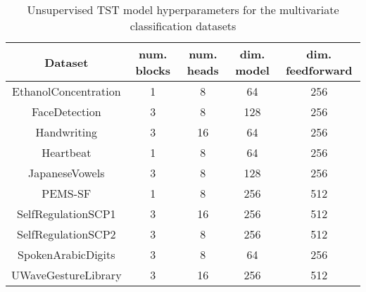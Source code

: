 \documentclass{article} \usepackage{iclr2021_conference,times}
\begin{document}
\begin{table}
\centering
\begin{tabular}{|c|c|c|c|c|} 
\hline
Dataset              & num. blocks & num. heads & dim. model & dim. feedforward  \\ 
\hline
EthanolConcentration & 1           & 8          & 64         & 256               \\
FaceDetection        & 3           & 8          & 128        & 256               \\
Handwriting          & 3           & 16         & 64         & 256               \\
Heartbeat            & 1           & 8          & 64         & 256               \\
JapaneseVowels       & 3           & 8          & 128        & 256               \\
PEMS-SF              & 1           & 8          & 256        & 512               \\
SelfRegulationSCP1   & 3           & 16         & 256        & 512               \\
SelfRegulationSCP2   & 3           & 8          & 256        & 512               \\
SpokenArabicDigits   & 3           & 8          & 64         & 256               \\
UWaveGestureLibrary  & 3           & 16         & 256        & 512               \\
\hline
\end{tabular}
\caption{Unsupervised TST model hyperparameters for the multivariate classification datasets}
\label{tab:hyperparams_unsupervised_classification_datasets}
\end{table}
\end{document}

